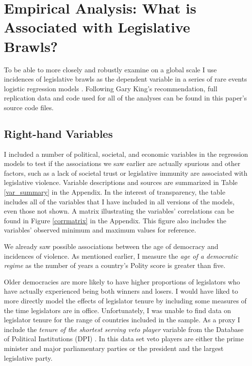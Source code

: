 \documentclass[a4paper]{article}\usepackage{graphicx, color}
\begin{document}
\section{Empirical Analysis: What is Associated with Legislative Brawls?}

To be able to more closely and robustly examine on a global scale I use incidences of legislative brawls as the dependent variable in a series of rare events logistic regression models \citep{KingRareEvents2001, KingRareEventsPA2001}. Following Gary King's \citeyearpar{King1995} recommendation, full replication data and code used for all of the analyses can be found in this paper's source code files.

\subsection{Right-hand Variables}

I included a number of political, societal, and economic variables in the regression models to test if the associations we saw earlier are actually spurious and other factors, such as a lack of societal trust or legislative immunity are associated with legislative violence. Variable descriptions and sources are summarized in Table \ref{var_summary} in the Appendix. In the interest of transparency, the table includes all of the variables that I have included in all versions of the models, even those not shown. A matrix illustrating the variables' correlations can be found in Figure \ref{corrmatrix} in the Appendix. This figure also includes the variables' observed minimum and maximum values for reference. 

We already saw possible associations between the age of democracy and incidences of violence. As mentioned earlier, I measure the {\emph{age of a democratic regime}} as the number of years a country's Polity score is greater than five.

Older democracies are more likely to have higher proportions of legislators who have actually experienced being both winners and losers. I would have liked to more directly model the effects of legislator tenure by including some measures of the time legislators are in office. Unfortunately, I was unable to find data on legislator tenure for the range of countries included in the sample. As a proxy I include the {\emph{tenure of the shortest serving veto player}} variable from the Database of Political Institutions (DPI) \citep[updated to 2010]{DPI2001}. In this data set veto players are either the prime minister and major parliamentary parties or the president and the largest legislative party.
\end{document}
